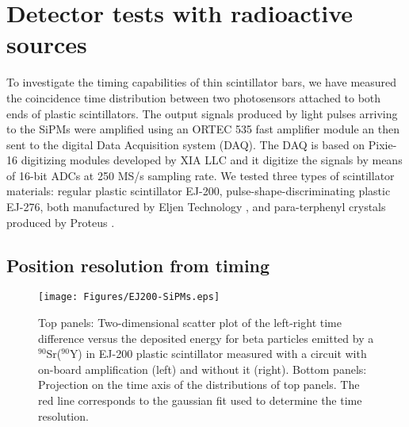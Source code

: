 \documentclass[preprint,3p,twocolumn]{elsarticle}
\begin{document}


\section{Detector tests with radioactive sources}
To  investigate the timing capabilities of thin scintillator bars, we have measured the coincidence time distribution between two photosensors attached to both ends of plastic scintillators. The output signals produced by light pulses arriving to the SiPMs were amplified using an ORTEC\textsuperscript{\textregistered}  535 fast amplifier module an then sent to the digital Data Acquisition system (DAQ). The DAQ is based on Pixie-16 digitizing modules developed by XIA LLC \cite{XIA} and it digitize the signals by means of 16-bit ADCs at 250 MS/s sampling rate.
We tested  three types of scintillator materials: regular plastic scintillator EJ-200, pulse-shape-discriminating plastic EJ-276, both manufactured by Eljen Technology \cite{eljen}, and para-terphenyl crystals produced by Proteus \cite{proteus}. 



\subsection{Position resolution from timing}
\begin{figure}[hbt]
\centering
\texttt{[image: Figures/EJ200-SiPMs.eps]}
\caption{Top panels: Two-dimensional scatter plot of the left-right time difference versus the deposited energy for beta particles emitted by a $^{90}$Sr($^{90}$Y)  in EJ-200 plastic scintillator measured with a circuit with on-board amplification (left) and without  it (right). Bottom panels: Projection on the time axis of the  distributions of top panels. The red line corresponds to the gaussian fit used to determine the time resolution.}
\label{fig:SiPMtiming}
\end{figure}
\end{document}

